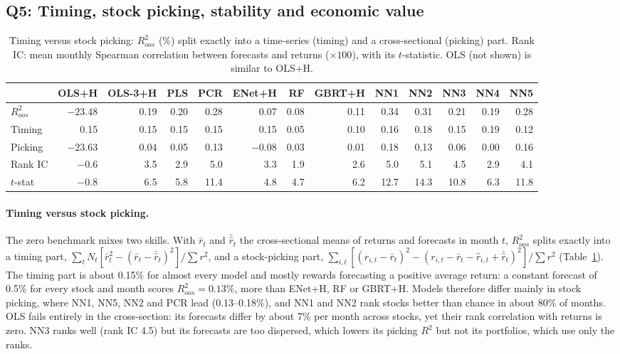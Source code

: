 \documentclass[10pt]{article}
\begin{document}
\subsection{Q5: Timing, stock picking, stability and economic value}
\begin{table}[t]\centering\scriptsize\setlength{\tabcolsep}{3.2pt}
\caption{Timing versus stock picking: $R^2_{oos}$ (\%) split exactly into a time-series (timing) and a cross-sectional
(picking) part. Rank IC: mean monthly Spearman correlation between forecasts and returns ($\times100$), with its
$t$-statistic. OLS (not shown) is similar to OLS+H.}\label{tab:decomp}
\begin{tabular}{lrrrrrrrrrrrr}
\toprule
 & OLS+H & OLS-3+H & PLS & PCR & ENet+H & RF & GBRT+H & NN1 & NN2 & NN3 & NN4 & NN5\\
\midrule
$R^2_{oos}$ & $-23.48$ & 0.19 & 0.20 & 0.28 & 0.07 & 0.08 & 0.11 & 0.34 & 0.31 & 0.21 & 0.19 & 0.28\\
\quad Timing & 0.15 & 0.15 & 0.15 & 0.15 & 0.15 & 0.05 & 0.10 & 0.16 & 0.18 & 0.15 & 0.19 & 0.12\\
\quad Picking & $-23.63$ & 0.04 & 0.05 & 0.13 & $-0.08$ & 0.03 & 0.01 & 0.18 & 0.13 & 0.06 & 0.00 & 0.16\\
Rank IC & $-0.6$ & 3.5 & 2.9 & 5.0 & 3.3 & 1.9 & 2.6 & 5.0 & 5.1 & 4.5 & 2.9 & 4.1\\
\quad $t$-stat & $-0.8$ & 6.5 & 5.8 & 11.4 & 4.8 & 4.7 & 6.2 & 12.7 & 14.3 & 10.8 & 6.3 & 11.8\\
\bottomrule
\end{tabular}
\end{table}
\paragraph{Timing versus stock picking.} The zero benchmark mixes two skills. With $\bar r_t$ and $\bar{\hat r}_t$ the
cross-sectional means of returns and forecasts in month $t$, $R^2_{oos}$ splits exactly into a timing part,
$\sum_t N_t[\bar r_t^2-(\bar r_t-\bar{\hat r}_t)^2]/\sum r^2$, and a stock-picking part,
$\sum_{i,t}[(r_{i,t}-\bar r_t)^2-(r_{i,t}-\bar r_t-\hat r_{i,t}+\bar{\hat r}_t)^2]/\sum r^2$ (Table~\ref{tab:decomp}).
The timing part is about 0.15\% for almost every model and mostly rewards forecasting a positive average return: a
constant forecast of 0.5\% for every stock and month scores $R^2_{oos}=0.13\%$, more than ENet+H, RF or GBRT+H. Models
therefore differ mainly in stock picking, where NN1, NN5, NN2 and PCR lead (0.13--0.18\%), and NN1 and NN2 rank stocks
better than chance in about 80\% of months. OLS fails entirely in the cross-section: its forecasts differ by about 7\% per
month across stocks, yet their rank correlation with returns is zero. NN3 ranks well (rank IC 4.5) but its forecasts are
too dispersed, which lowers its picking $R^2$ but not its portfolios, which use only the ranks.
\end{document}
